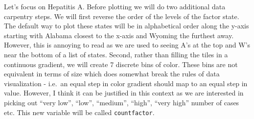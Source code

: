 \documentclass[
  letterpaper,
  DIV=11,
  numbers=noendperiod]{scrreprt}
\newenvironment{Shaded}{\begin{snugshade}}{\end{snugshade}}
\newcommand{\AttributeTok}[1]{\textcolor[rgb]{0.40,0.45,0.13}{#1}}
\newcommand{\DecValTok}[1]{\textcolor[rgb]{0.68,0.00,0.00}{#1}}
\newcommand{\FunctionTok}[1]{\textcolor[rgb]{0.28,0.35,0.67}{#1}}
\newcommand{\NormalTok}[1]{\textcolor[rgb]{0.00,0.23,0.31}{#1}}
\newcommand{\OtherTok}[1]{\textcolor[rgb]{0.00,0.23,0.31}{#1}}
\newcommand{\SpecialCharTok}[1]{\textcolor[rgb]{0.37,0.37,0.37}{#1}}
\newcommand{\StringTok}[1]{\textcolor[rgb]{0.13,0.47,0.30}{#1}}
\begin{document}
Let's focus on Hepatitis A. Before plotting we will do two additional
data carpentry steps. We will first reverse the order of the levels of
the factor state. The default way to plot these states will be in
alphabetical order along the y-axis starting with Alabama closest to the
x-axis and Wyoming the furthest away. However, this is annoying to read
as we are used to seeing A's at the top and W's near the bottom of a
list of states. Second, rather than filling the tiles in a continuous
gradient, we will create 7 discrete bins of color. These bins are not
equivalent in terms of size which does somewhat break the rules of data
visualization - i.e.~an equal step in color gradient should map to an
equal step in value. However, I think it can be justified in this
context as we are interested in picking out ``very low'', ``low'',
``medium'', ``high'', ``very high'' number of cases etc. This new
variable will be called \texttt{countfactor}.

\begin{Shaded}
\end{Shaded}
\end{document}

